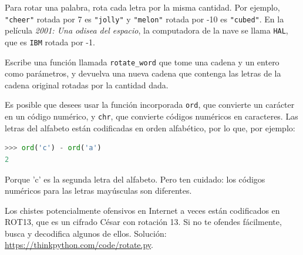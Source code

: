 Para rotar una palabra, rota cada letra por la misma cantidad. Por ejemplo, \texttt{"cheer"} rotada por 7 es \texttt{"jolly"} y \texttt{"melon"} rotada por -10 es \texttt{"cubed"}. En la película \textit{2001: Una odisea del espacio}, la computadora de la nave se llama \texttt{HAL}, que es \texttt{IBM} rotada por -1.

Escribe una función llamada \texttt{rotate\_word} que tome una cadena y un entero como parámetros, y devuelva una nueva cadena que contenga las letras de la cadena original rotadas por la cantidad dada.

Es posible que desees usar la función incorporada \texttt{ord}, que convierte un carácter en un código numérico, y \texttt{chr}, que convierte códigos numéricos en caracteres. Las letras del alfabeto están codificadas en orden alfabético, por lo que, por ejemplo:

\begin{lstlisting}[language=Python]
>>> ord('c') - ord('a')
2
\end{lstlisting}

Porque 'c' es la segunda letra del alfabeto. Pero ten cuidado: los códigos numéricos para las letras mayúsculas son diferentes.

Los chistes potencialmente ofensivos en Internet a veces están codificados en ROT13, que es un cifrado César con rotación 13. Si no te ofendes fácilmente, busca y decodifica algunos de ellos. Solución: \url{https://thinkpython.com/code/rotate.py}.